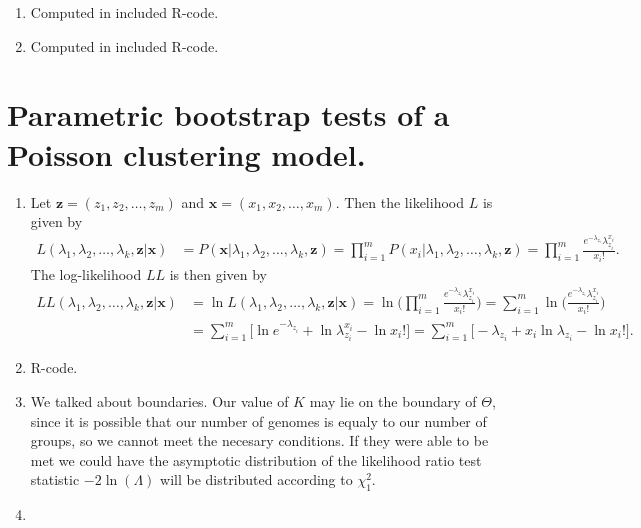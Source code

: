 \documentclass[12pt]{article}
\begin{document}
    \begin{enumerate}[label = \textbf{\alph*.}]
        \item Computed in included R-code.
        
        \item Computed in included R-code.

    \end{enumerate}

\section*{Parametric bootstrap tests of a Poisson clustering model.}
    \begin{enumerate}[label = \textbf{\alph*.}]
        \item Let $\bm{z} = (z_1, z_2, \dots, z_m)$ and $\bm{x} = (x_1, x_2, \dots, x_m)$.  Then the likelihood $L$ is given by
            \begin{align}\label{eq:3b_lik}
                L(\lambda_1, \lambda_2, \dots, \lambda_k, \bm{z} | \bm{x}) &= P(\bm{x} | \lambda_1, \lambda_2, \dots, \lambda_k, \bm{z}) = \prod_{i = 1}^m P(x_i | \lambda_1, \lambda_2, \dots, \lambda_k, \bm{z})= \prod_{i = 1}^m \frac{e^{-\lambda_{z_i}}\lambda_{z_i}^{x_i}}{x_i!}.
            \end{align}
        The log-likelihood $LL$ is then given by
            \begin{align}\label{eq:3b_loglik}
                LL(\lambda_1, \lambda_2, \dots, \lambda_k, \bm{z} | \bm{x}) &= \ln{L(\lambda_1, \lambda_2, \dots, \lambda_k, \bm{z} | \bm{x})} = \ln\Bigg(\prod_{i = 1}^m \frac{e^{-\lambda_{z_i}}\lambda_{z_i}^{x_i}}{x_i!}\Bigg) = \sum_{i = 1}^m \ln\Bigg(\frac{e^{-\lambda_{z_i}}\lambda_{z_i}^{x_i}}{x_i!}\Bigg)\nonumber\\
                        &= \sum_{i = 1}^m \Big[ \ln{e^{-\lambda_{z_i}}} + \ln{\lambda_{z_i}^{x_i}} - \ln{x_i!}\Big] = \sum_{i = 1}^m \Big[-\lambda_{z_i} + x_i \ln{\lambda_{z_i}} - \ln{x_i!}\Big].
            \end{align}
    
        
        \item R-code.
        
        \item We talked about boundaries. Our value of $K$ may lie on the boundary of $\Theta$, since it is possible that our number of genomes is equaly to our number of groups, so we cannot meet the necesary conditions. If they were able to be met we could have the asymptotic distribution of the likelihood ratio test statistic $-2\ln(\Lambda)$ will be distributed according to $\chi^2_1$.

        
        \item 
    \end{enumerate}
    
\end{document}
